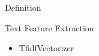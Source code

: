 \documentclass[
 size=12pt,
 paper=smartboard, %
 mode=present, %
 display=slides, %
style=tuliplab,
pauseslide,
fleqn,leqno]{powerdot}
\begin{document}
\begin{slide}{Definition}
\begin{slide}[toc=,bm=]{Text Feature Extraction}
\begin{itemize}
  \item TfidfVectorizer
\end{itemize}
\end{slide}







\end{slide}
\end{document}

